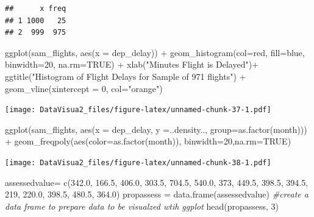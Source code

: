 \documentclass[
]{article}
\newenvironment{Shaded}{\begin{snugshade}}{\end{snugshade}}
\newcommand{\AttributeTok}[1]{\textcolor[rgb]{0.77,0.63,0.00}{#1}}
\newcommand{\CommentTok}[1]{\textcolor[rgb]{0.56,0.35,0.01}{\textit{#1}}}
\newcommand{\ConstantTok}[1]{\textcolor[rgb]{0.00,0.00,0.00}{#1}}
\newcommand{\DecValTok}[1]{\textcolor[rgb]{0.00,0.00,0.81}{#1}}
\newcommand{\FloatTok}[1]{\textcolor[rgb]{0.00,0.00,0.81}{#1}}
\newcommand{\FunctionTok}[1]{\textcolor[rgb]{0.00,0.00,0.00}{#1}}
\newcommand{\NormalTok}[1]{#1}
\newcommand{\OtherTok}[1]{\textcolor[rgb]{0.56,0.35,0.01}{#1}}
\newcommand{\SpecialCharTok}[1]{\textcolor[rgb]{0.00,0.00,0.00}{#1}}
\newcommand{\StringTok}[1]{\textcolor[rgb]{0.31,0.60,0.02}{#1}}
\begin{document}
\begin{verbatim}
##      x freq
## 1 1000   25
## 2  999  975
\end{verbatim}

\begin{Shaded}
\begin{Highlighting}[]
\FunctionTok{ggplot}\NormalTok{(sam\_flights, }\FunctionTok{aes}\NormalTok{(}\AttributeTok{x =}\NormalTok{ dep\_delay)) }\SpecialCharTok{+} \FunctionTok{geom\_histogram}\NormalTok{(}\AttributeTok{col=}\StringTok{\textquotesingle{}red\textquotesingle{}}\NormalTok{, }\AttributeTok{fill=}\StringTok{\textquotesingle{}blue\textquotesingle{}}\NormalTok{, }\AttributeTok{binwidth=}\DecValTok{20}\NormalTok{, }\AttributeTok{na.rm=}\ConstantTok{TRUE}\NormalTok{) }\SpecialCharTok{+} \FunctionTok{xlab}\NormalTok{(}\StringTok{"Minutes Flight is Delayed"}\NormalTok{)}\SpecialCharTok{+} \FunctionTok{ggtitle}\NormalTok{(}\StringTok{"Histogram of Flight Delays for Sample of 971 flights"}\NormalTok{) }\SpecialCharTok{+} \FunctionTok{geom\_vline}\NormalTok{(}\AttributeTok{xintercept =} \DecValTok{0}\NormalTok{, }\AttributeTok{col=}\StringTok{"orange"}\NormalTok{)}
\end{Highlighting}
\end{Shaded}

\texttt{[image: DataVisua2\_files/figure-latex/unnamed-chunk-37-1.pdf]}

\begin{Shaded}
\begin{Highlighting}[]
\FunctionTok{ggplot}\NormalTok{(sam\_flights, }\FunctionTok{aes}\NormalTok{(}\AttributeTok{x =}\NormalTok{ dep\_delay, }\AttributeTok{y =}\NormalTok{..density.., }\AttributeTok{group=}\FunctionTok{as.factor}\NormalTok{(month))) }\SpecialCharTok{+} \FunctionTok{geom\_freqpoly}\NormalTok{(}\FunctionTok{aes}\NormalTok{(}\AttributeTok{color=}\FunctionTok{as.factor}\NormalTok{(month)), }\AttributeTok{binwidth=}\DecValTok{20}\NormalTok{,}\AttributeTok{na.rm=}\ConstantTok{TRUE}\NormalTok{) }
\end{Highlighting}
\end{Shaded}

\texttt{[image: DataVisua2\_files/figure-latex/unnamed-chunk-38-1.pdf]}

\begin{Shaded}
\begin{Highlighting}[]
\NormalTok{assessedvalue}\OtherTok{=} \FunctionTok{c}\NormalTok{(}\FloatTok{342.0}\NormalTok{, }\FloatTok{166.5}\NormalTok{, }\FloatTok{406.0}\NormalTok{, }\FloatTok{303.5}\NormalTok{, }\FloatTok{704.5}\NormalTok{, }\FloatTok{540.0}\NormalTok{, }\DecValTok{373}\NormalTok{, }\FloatTok{449.5}\NormalTok{, }\FloatTok{398.5}\NormalTok{, }\FloatTok{394.5}\NormalTok{, }\DecValTok{219}\NormalTok{, }\FloatTok{220.0}\NormalTok{, }\FloatTok{398.5}\NormalTok{, }\FloatTok{480.5}\NormalTok{, }\FloatTok{364.0}\NormalTok{)}
\NormalTok{propassess }\OtherTok{=} \FunctionTok{data.frame}\NormalTok{(assessedvalue) }\CommentTok{\#create a data frame to prepare data to be visualzed wtih ggplot}
\FunctionTok{head}\NormalTok{(propassess, }\DecValTok{3}\NormalTok{)}
\end{Highlighting}
\end{Shaded}
\end{document}
